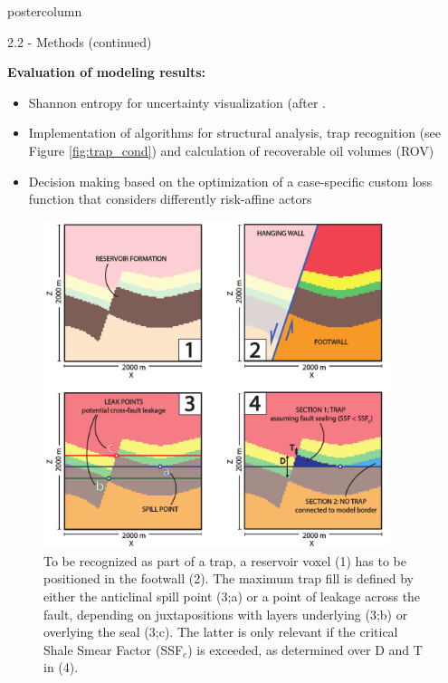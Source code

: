 \documentclass{beamer}
\begin{document}
\begin{frame}
\begin{columns}
\begin{column}{.499\textwidth}
\begin{beamercolorbox}[center]{postercolumn}
\begin{minipage}{.98\textwidth}
{\begin{myblock}{2.2 - Methods (continued)}
								\begin{minipage}[h]{0.329\textwidth}
									\textbf{Evaluation of modeling results:}
										\begin{itemize}
										\item Shannon entropy for uncertainty visualization (after \citet{wellmann2012uncertainties}.
										\item Implementation of algorithms for structural analysis, trap recognition (see Figure \ref{fig:trap_cond}) and calculation of recoverable oil volumes (ROV)
										\item Decision making based on the optimization of a case-specific custom loss function that considers differently risk-affine actors
										\end{itemize}
								\end{minipage}
								\begin{minipage}{0.327\textwidth}
								\begin{figure}
									\centering\includegraphics[width=0.9\textwidth]{figures/Trap_Cond_H}
									\caption{To be recognized as part of a trap, a reservoir voxel (1) has
									to be positioned in the	footwall (2). The maximum trap fill is defined by either the anticlinal spill point (3;a) or a point of leakage across the fault, depending on juxtapositions with layers
									underlying (3;b) or overlying the seal (3;c). The latter is only relevant if the
									critical Shale Smear Factor (SSF$_c$) is exceeded, as determined over D and T in (4).}

\end{figure}
\end{minipage}
\end{myblock}}
\end{minipage}
\end{beamercolorbox}
\end{column}
\end{columns}
\end{frame}
\end{document}
